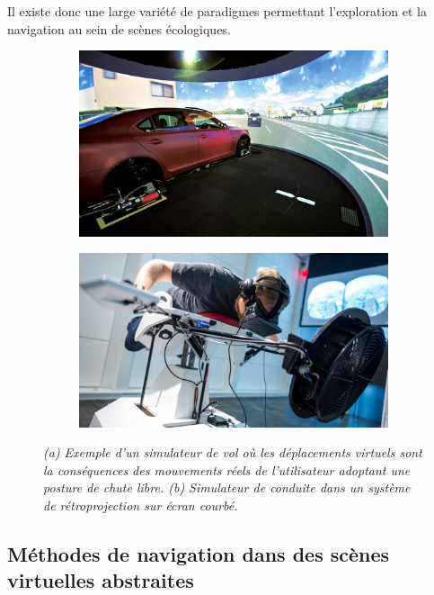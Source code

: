Il existe donc une large variété de paradigmes permettant l'exploration et la navigation au sein de scènes écologiques. 

\begin{figure}[h]
  \begin{subfigure}{.5\textwidth}
  \centering
  {\includegraphics[width=0.9\linewidth]{./figures/ch3/driving_simu}}
    \caption{}
    \label{Fig:driving_simu}
  \end{subfigure}
  \begin{subfigure}{.4\textwidth}
  \centering
  {\includegraphics[width=0.7\linewidth]{./figures/ch3/flight_simu}}
    \caption{}
    \label{Fig:flight_simu}
  \hspace{0.3cm}
  \end{subfigure}
  \caption{\it (a) Exemple d'un simulateur de vol où les déplacements virtuels sont la conséquences des mouvements réels de l'utilisateur adoptant une posture de chute libre.
  (b) Simulateur de conduite dans un système de rétroprojection sur écran courbé.
  }
\end{figure}

\subsection{Méthodes de navigation dans des scènes virtuelles abstraites}

